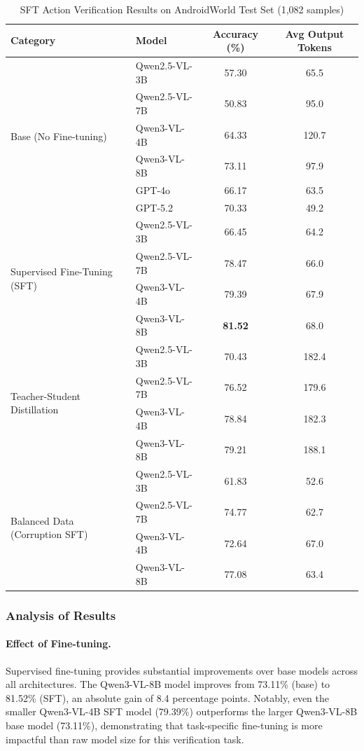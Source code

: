 \documentclass[11pt,a4paper]{article}
\begin{document}
\begin{table}[h]
\centering
\caption{SFT Action Verification Results on AndroidWorld Test Set (1,082 samples)}
\label{tab:main_results}
\begin{tabular}{llcc}
\toprule
\textbf{Category} & \textbf{Model} & \textbf{Accuracy (\%)} & \textbf{Avg Output Tokens} \\
\midrule
\multirow{6}{*}{Base (No Fine-tuning)} 
& Qwen2.5-VL-3B & 57.30 & 65.5 \\
& Qwen2.5-VL-7B & 50.83 & 95.0 \\
& Qwen3-VL-4B & 64.33 & 120.7 \\
& Qwen3-VL-8B & 73.11 & 97.9 \\
& GPT-4o & 66.17 & 63.5 \\
& GPT-5.2 & 70.33 & 49.2 \\
\midrule
\multirow{4}{*}{Supervised Fine-Tuning (SFT)}
& Qwen2.5-VL-3B & 66.45 & 64.2 \\
& Qwen2.5-VL-7B & 78.47 & 66.0 \\
& Qwen3-VL-4B & 79.39 & 67.9 \\
& Qwen3-VL-8B & \textbf{81.52} & 68.0 \\
\midrule
\multirow{4}{*}{Teacher-Student Distillation}
& Qwen2.5-VL-3B & 70.43 & 182.4 \\
& Qwen2.5-VL-7B & 76.52 & 179.6 \\
& Qwen3-VL-4B & 78.84 & 182.3 \\
& Qwen3-VL-8B & 79.21 & 188.1 \\
\midrule
\multirow{4}{*}{Balanced Data (Corruption SFT)}
& Qwen2.5-VL-3B & 61.83 & 52.6 \\
& Qwen2.5-VL-7B & 74.77 & 62.7 \\
& Qwen3-VL-4B & 72.64 & 67.0 \\
& Qwen3-VL-8B & 77.08 & 63.4 \\
\bottomrule
\end{tabular}
\end{table}

\subsubsection{Analysis of Results}

\paragraph{Effect of Fine-tuning.} Supervised fine-tuning provides substantial improvements over base models across all architectures. The Qwen3-VL-8B model improves from 73.11\% (base) to 81.52\% (SFT), an absolute gain of 8.4 percentage points. Notably, even the smaller Qwen3-VL-4B SFT model (79.39\%) outperforms the larger Qwen3-VL-8B base model (73.11\%), demonstrating that task-specific fine-tuning is more impactful than raw model size for this verification task.
\end{document}
